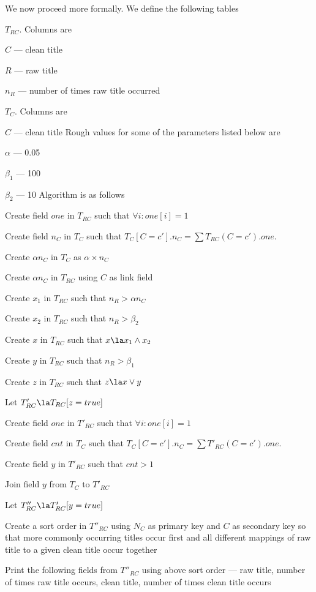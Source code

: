 We now proceed more formally. We define the following tables
\be
\item \(T_{RC}\). Columns are
\be
\item \(C\) --- clean title 
\item \(R\) --- raw title 
\item \(n_R\) --- number of times raw title occurred
\ee
\item \(T_C\). Columns are
\be
\item \(C\) --- clean title 
\ee
\ee
Rough values for some of the parameters listed below are
\be
\item \(\alpha\) --- 0.05
\item \(\beta_1\) --- 100
\item \(\beta_2\) --- 10
\ee
Algorithm is as follows
\be
\item Create field \(one\) in \(T_{RC}\) such that \(\forall i: one[i] = 1\)
\item Create field \(n_C\) in \(T_C\) such that \(T_C[C=c'].n_C = \sum
T_{RC}(C=c').one\). 
\item Create \(\alpha n_C\) in \(T_C\) as \(\alpha \times n_C\)
\item Create \(\alpha n_C\) in \(T_{RC}\) using \(C\) as link field
\item Create \(x_1\) in \(T_{RC}\) such that \(n_R > \alpha n_C\)
\item Create \(x_2\) in \(T_{RC}\) such that \(n_R > \beta_2\)
\item Create \(x\) in \(T_{RC}\) such that \(x \la x_1 \wedge x_2\)
\item Create \(y\) in \(T_{RC}\) such that \(n_R > \beta_1\)
\item Create \(z\) in \(T_{RC}\) such that \(z \la x \vee y\)
\item Let \(T'_{RC} \la T_{RC}[z = true]\)

\item Create field \(one\) in \(T'_{RC}\) such that \(\forall i: one[i] = 1\)
\item Create field \(cnt\) in \(T_C\) such that \(T_C[C=c'].n_C = \sum
T'_{RC}(C=c').one\). 
\item Create field \(y\) in \(T'_{RC}\) such that \(cnt > 1\)
\item Join field \(y\) from \(T_C\) to \(T'_{RC}\)

\item Let \(T''_{RC} \la T'_{RC}[y = true]\)
\item Create a sort order in \(T''_{RC}\) using \(N_C\) as primary key
and \(C\) as secondary key so that more commonly occurring titles occur
first and all different mappings of raw title to a given clean title
occur together
\item Print the following fields from \(T''_{RC}\) using above sort
order --- raw title, number of times raw title occurs, clean title,
      number of times clean title occurs

